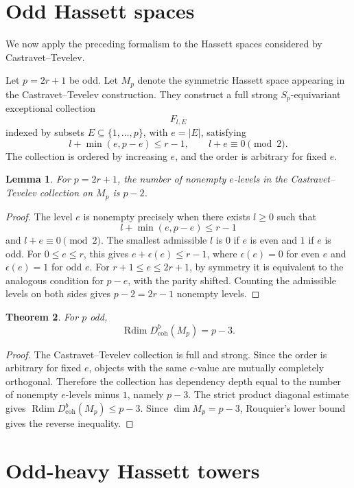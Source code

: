 \documentclass[11pt]{amsart}
\numberwithin{equation}{section}
\newtheorem{theorem}{Theorem}[section]
\newtheorem{lemma}[theorem]{Lemma}
\theoremstyle{definition}
\DeclareMathOperator{\Rdim}{Rdim}
\newcommand{\Db}{D^b_{\mathrm{coh}}}
\begin{document}
\section{Odd Hassett spaces}

We now apply the preceding formalism to the Hassett spaces considered by Castravet--Tevelev.

Let $p=2r+1$ be odd. Let $M_p$ denote the symmetric Hassett space appearing in the Castravet--Tevelev construction. They construct a full strong $S_p$-equivariant exceptional collection
\[
F_{l,E}
\]
indexed by subsets $E\subseteq\{1,\dots,p\}$, with $e=|E|$, satisfying
\[
l+\min(e,p-e)\le r-1,
\qquad
l+e\equiv0\pmod 2.
\]
The collection is ordered by increasing $e$, and the order is arbitrary for fixed $e$.

\begin{lemma}
For $p=2r+1$, the number of nonempty $e$-levels in the Castravet--Tevelev collection on $M_p$ is $p-2$.
\end{lemma}

\begin{proof}
The level $e$ is nonempty precisely when there exists $l\ge0$ such that
\[
l+\min(e,p-e)\le r-1
\]
and $l+e\equiv0\pmod2$. The smallest admissible $l$ is $0$ if $e$ is even and $1$ if $e$ is odd. For $0\le e\le r$, this gives $e+\epsilon(e)\le r-1$, where $\epsilon(e)=0$ for even $e$ and $\epsilon(e)=1$ for odd $e$. For $r+1\le e\le 2r+1$, by symmetry it is equivalent to the analogous condition for $p-e$, with the parity shifted. Counting the admissible levels on both sides gives $p-2=2r-1$ nonempty levels.
\end{proof}

\begin{theorem}
For $p$ odd,
\[
\Rdim \Db(M_p)=p-3.
\]
\end{theorem}

\begin{proof}
The Castravet--Tevelev collection is full and strong. Since the order is arbitrary for fixed $e$, objects with the same $e$-value are mutually completely orthogonal. Therefore the collection has dependency depth equal to the number of nonempty $e$-levels minus $1$, namely $p-3$. The strict product diagonal estimate gives $\Rdim \Db(M_p)\le p-3$. Since $\dim M_p=p-3$, Rouquier's lower bound gives the reverse inequality.
\end{proof}

\section{Odd-heavy Hassett towers}
\end{document}
